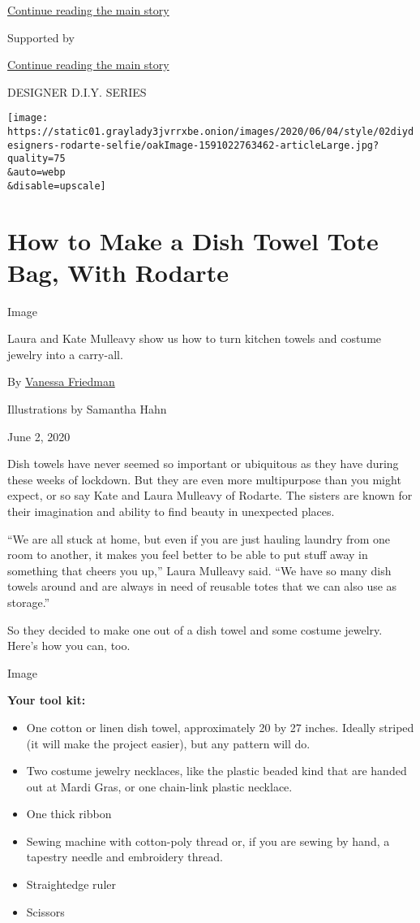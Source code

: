 \protect\hyperlink{after-top}{Continue reading the main story}

Supported by

\protect\hyperlink{after-sponsor}{Continue reading the main story}

DESIGNER D.I.Y. SERIES

\texttt{[image: https://static01.graylady3jvrrxbe.onion/images/2020/06/04/style/02diydesigners-rodarte-selfie/oakImage-1591022763462-articleLarge.jpg?quality=75\\\&auto=webp\\\&disable=upscale]}

\hypertarget{how-to-make-a-dish-towel-tote-bag-with-rodarte}{%
\section{How to Make a Dish Towel Tote Bag, With
Rodarte}\label{how-to-make-a-dish-towel-tote-bag-with-rodarte}}

Image

Laura and Kate Mulleavy show us how to turn kitchen towels and costume
jewelry into a carry-all.

By \href{https://www.nytimes3xbfgragh.onion/by/vanessa-friedman}{Vanessa
Friedman}

Illustrations by Samantha Hahn

June 2, 2020

Dish towels have never seemed so important or ubiquitous as they have
during these weeks of lockdown. But they are even more multipurpose than
you might expect, or so say Kate and Laura Mulleavy of Rodarte. The
sisters are known for their imagination and ability to find beauty in
unexpected places.

``We are all stuck at home, but even if you are just hauling laundry
from one room to another, it makes you feel better to be able to put
stuff away in something that cheers you up,'' Laura Mulleavy said. ``We
have so many dish towels around and are always in need of reusable totes
that we can also use as storage.''

So they decided to make one out of a dish towel and some costume
jewelry. Here's how you can, too.

Image

\textbf{Your tool kit:}

\begin{itemize}
\item
  One cotton or linen dish towel, approximately 20 by 27 inches. Ideally
  striped (it will make the project easier), but any pattern will do.
\item
  Two costume jewelry necklaces, like the plastic beaded kind that are
  handed out at Mardi Gras, or one chain-link plastic necklace.
\item
  One thick ribbon
\item
  Sewing machine with cotton-poly thread or, if you are sewing by hand,
  a tapestry needle and embroidery thread.
\item
  Straightedge ruler
\item
  Scissors
\end{itemize}

